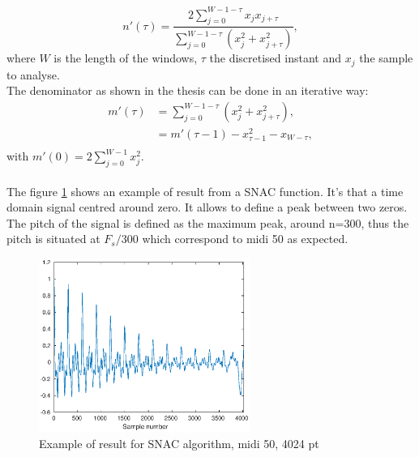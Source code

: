 \documentclass[twoside,twocolumn]{report}
\begin{document}
\begin{equation}
	n'(\tau)=\frac{2 \sum_{j=0}^{W-1-\tau}x_j x_{j+\tau}}{\sum_{j=0}^{W-1-\tau}(x^2_j+ x^2_{j+\tau})},
\end{equation}
where $W$ is the length of the windows, $\tau$ the discretised instant and $x_j$ the sample to analyse.\\
The denominator as shown in the thesis \cite{mcleod2009fast} can be done in an iterative way:
\begin{equation}
\begin{split}
m'(\tau) & = \sum_{j=0}^{W-1-\tau}(x^2_j+ x^2_{j+\tau}),\\
		 & = m'(\tau-1)- x^2_{\tau-1}- x_{W-\tau},\\
\end{split}
\end{equation} 
with $m'(0)= 2 \sum_{j=0}^{W-1}x^2_j$.\\
\\
The figure \ref{SNACalgo50} shows an example of result from a SNAC function. It's  that a time domain signal centred around zero. It allows to define a peak between two zeros. The pitch of the signal is defined as the maximum peak, around n=300, thus the pitch is situated at $F_s/300$ which correspond to midi 50 as expected.
\begin{figure}[h!]
	\centering
	\includegraphics[width=260px]{./images/SNAC_functionR_4024pt_midi50.eps}
	\caption{Example of result for SNAC algorithm, midi 50, 4024 pt}
	\label{SNACalgo50}
\end{figure}
\end{document}
